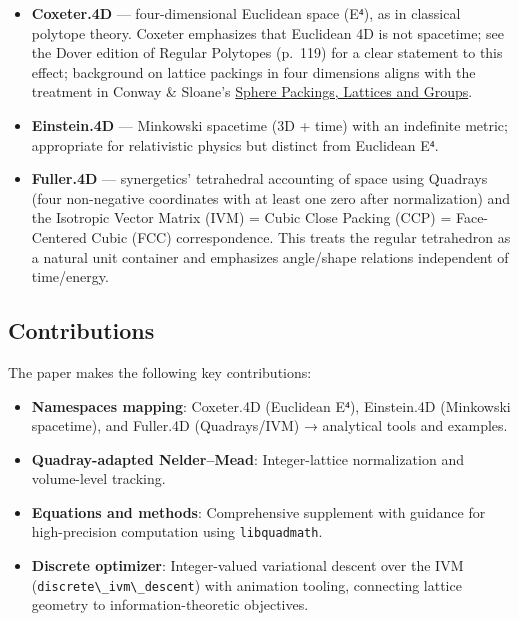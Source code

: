 \documentclass[
  10pt,
]{article}
\newcommand{\passthrough}[1]{#1}
\providecommand{\tightlist}{%
  \setlength{\itemsep}{0pt}\setlength{\parskip}{0pt}}
\begin{document}
\begin{itemize}
\tightlist
\item
  \textbf{Coxeter.4D} --- four-dimensional Euclidean space (E⁴), as in
  classical polytope theory. Coxeter emphasizes that Euclidean 4D is not
  spacetime; see the Dover edition of Regular Polytopes (p.~119) for a
  clear statement to this effect; background on lattice packings in four
  dimensions aligns with the treatment in Conway \& Sloane's
  \href{https://link.springer.com/book/10.1007/978-1-4757-6568-7}{Sphere
  Packings, Lattices and Groups}.
\item
  \textbf{Einstein.4D} --- Minkowski spacetime (3D + time) with an
  indefinite metric; appropriate for relativistic physics but distinct
  from Euclidean E⁴.
\item
  \textbf{Fuller.4D} --- synergetics' tetrahedral accounting of space
  using Quadrays (four non-negative coordinates with at least one zero
  after normalization) and the Isotropic Vector Matrix (IVM) = Cubic
  Close Packing (CCP) = Face-Centered Cubic (FCC) correspondence. This
  treats the regular tetrahedron as a natural unit container and
  emphasizes angle/shape relations independent of time/energy.
\end{itemize}

\hypertarget{contributions}{%
\subsection{Contributions}\label{contributions}}

The paper makes the following key contributions:

\begin{itemize}
\tightlist
\item
  \textbf{Namespaces mapping}: Coxeter.4D (Euclidean E⁴), Einstein.4D
  (Minkowski spacetime), and Fuller.4D (Quadrays/IVM) → analytical tools
  and examples.
\item
  \textbf{Quadray-adapted Nelder--Mead}: Integer-lattice normalization
  and volume-level tracking.
\item
  \textbf{Equations and methods}: Comprehensive supplement with guidance
  for high-precision computation using
  \passthrough{\lstinline!libquadmath!}.
\item
  \textbf{Discrete optimizer}: Integer-valued variational descent over
  the IVM (\passthrough{\lstinline!discrete\_ivm\_descent!}) with
  animation tooling, connecting lattice geometry to
  information-theoretic objectives.
\end{itemize}
\end{document}
